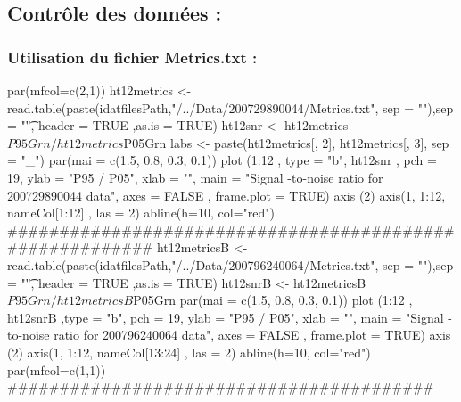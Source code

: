 \documentclass[a4paper,10pt]{article}
\begin{document}
\subsection{Contrôle des données :}
\subsubsection{ Utilisation du fichier Metrics.txt :}
\begin{Schunk}
\begin{Sinput}
 par(mfcol=c(2,1))
 ht12metrics  <- read.table(paste(idatfilesPath,"/../Data/200729890044/Metrics.txt",
 sep = ""),sep = "\t", header = TRUE ,as.is = TRUE)
 ht12snr  <- ht12metrics$P95Grn/ht12metrics$P05Grn
 labs  <- paste(ht12metrics[, 2],  ht12metrics[, 3], sep = "_")
 par(mai = c(1.5, 0.8, 0.3, 0.1))
 plot (1:12 , type = "b",  ht12snr , pch = 19, ylab = "P95 / P05", xlab = "",
 main = "Signal -to-noise  ratio  for  200729890044  data", axes = FALSE ,
 frame.plot = TRUE)
 axis (2)
 axis(1, 1:12, nameCol[1:12] , las = 2)
 abline(h=10, col="red")
 #########################################################
 ht12metricsB  <- read.table(paste(idatfilesPath,"/../Data/200796240064/Metrics.txt",
 sep = ""),sep = "\t", header = TRUE ,as.is = TRUE)
 ht12snrB  <- ht12metricsB$P95Grn/ht12metricsB$P05Grn
 par(mai = c(1.5, 0.8, 0.3, 0.1))
 plot (1:12 ,  ht12snrB ,type = "b", pch = 19, ylab = "P95 / P05", xlab = "",
 main = "Signal -to-noise  ratio  for  200796240064  data", axes = FALSE ,
 frame.plot = TRUE)
 axis (2)
 axis(1, 1:12, nameCol[13:24] , las = 2)
 abline(h=10, col="red")
 par(mfcol=c(1,1))
 #########################################
\end{Sinput}
\end{Schunk}
\end{document}
